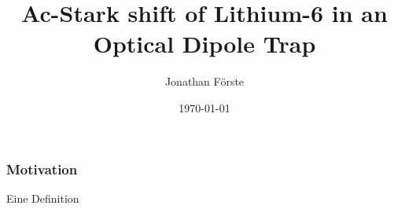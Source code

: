 \documentclass{beamer}
\title{Ac-Stark shift of Lithium-6 in an Optical Dipole Trap}
\author{Jonathan Förste}
\date{\today}
\begin{document}
\maketitle
\begin{frame}
	\frametitle{Motivation}
	\begin{Definition}
		Eine Definition
	\end{Definition}
\end{frame}
\end{document}
